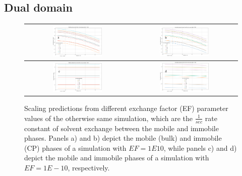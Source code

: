 \begin{supplementary}
\subsection{Dual domain}

\begin{figure}[h!]
    \centering
    \begin{tabular}{c|c}
        \includegraphics[width=0.49\textwidth]{images/ROSSpy/sensitivity_analyses/EF/mobile_large_ef.png} &
        \includegraphics[width=0.49\textwidth]{images/ROSSpy/sensitivity_analyses/EF/immobile_large_ef.png} \\ \midrule
        \includegraphics[width=0.49\textwidth]{images/ROSSpy/sensitivity_analyses/EF/mobile_small_ef.png} & 
        \includegraphics[width=0.49\textwidth]{images/ROSSpy/sensitivity_analyses/EF/immobile_small_ef.png} \\ \bottomrule
    \end{tabular}
    \caption{
        Scaling predictions from different exchange factor (EF) parameter values of the otherwise same simulation, which are the $\frac{1}{sec}$ rate constant of solvent exchange between the mobile and immobile phases. Panels a) and b) depict the mobile (bulk) and immobile (CP) phases of a simulation with $EF=1E10$, while panels c) and d) depict the mobile and immobile phases of a simulation with $EF=1E-10$, respectively.
    }
    \label{ef_values}
\end{figure}


\end{supplementary}
